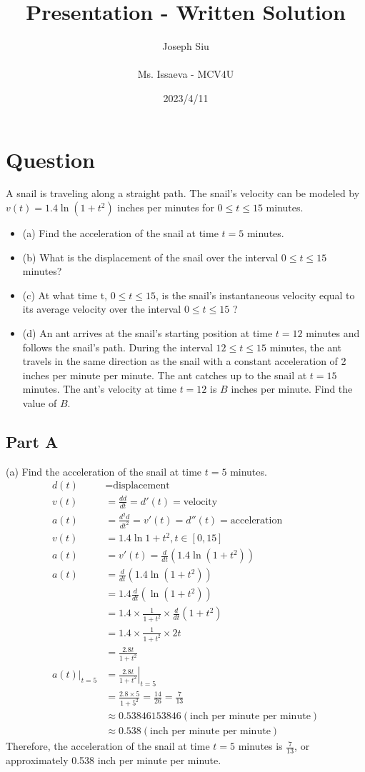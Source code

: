\documentclass{article}
\title{Presentation - Written Solution}
\author{Joseph Siu \\ \\ Ms. Issaeva - MCV4U}
\date{2023/4/11}
\begin{document}
\section{Question}
A snail is traveling along a straight path. The snail's velocity can be modeled by $v(t) = 1.4\ln(1+t^2)$ inches per minutes for $0\leq t\leq 15$ minutes.
\begin{itemize}
    \item (a) Find the acceleration of the snail at time $t=5$ minutes.
    \item (b) What is the displacement of the snail over the interval $0\leq t\leq 15$ minutes?
    \item (c) At what time t, $0\leq t\leq 15$, is the snail's instantaneous velocity equal to its average velocity over the interval $0\leq t\leq 15$ ?
    \item (d) An ant arrives at the snail's starting position at time $t=12$ minutes and follows the snail's path. During the interval $12\leq t\leq 15$ minutes, the ant travels in the same direction as the snail with a constant acceleration of 2 inches per minute per minute. The ant catches up to the snail at $t=15$ minutes. The ant's velocity at time $t=12$ is $B$ inches per minute. Find the value of $B$. 
\end{itemize}

\newpage
\subsection{Part A}
(a) Find the acceleration of the snail at time $t=5$ minutes.
\begin{align*}
    d(t) &= \text{displacement} \\
    v(t) &= \frac{dd}{dt} = d'(t) = \text{velocity} \\
    a(t) &= \frac{d^2d} {dt^2} = v'(t) = d''(t) = \text{acceleration} \\
    v(t) &= 1.4 \ln{1+t^2}, t\in [0,15] \\
    a(t) &= v'(t) = \frac{d}{dt} (1.4\ln(1+t^2))\\
    a(t) &= \frac{d}{dt} (1.4\ln(1+t^2))\\
    &= 1.4\frac{d}{dt} (\ln(1+t^2))\\
    &= 1.4\times \frac{1}{1+t^2} \times \frac{d}{dt} (1+t^2)\\
    &= 1.4\times \frac{1}{1+t^2} \times 2t\\
    &= \frac{2.8t}{1+t^2}\\
    \left. a(t)\right|_{t=5} &= \left. \frac{2.8t}{1+t^2}\right|_{t=5} \\
        &= \frac{2.8\times 5}{1 + 5^2} = \frac{14}{26} = \frac{7}{13} \\
        &\approx 0.53846153846 (\text{inch per minute per minute})\\
        &\approx 0.538 (\text{inch per minute per minute}) 
\end{align*}
Therefore, the acceleration of the snail at time $t=5$ minutes is $\frac{7}{13}$, or approximately 0.538 inch per minute per minute.
\end{document}
